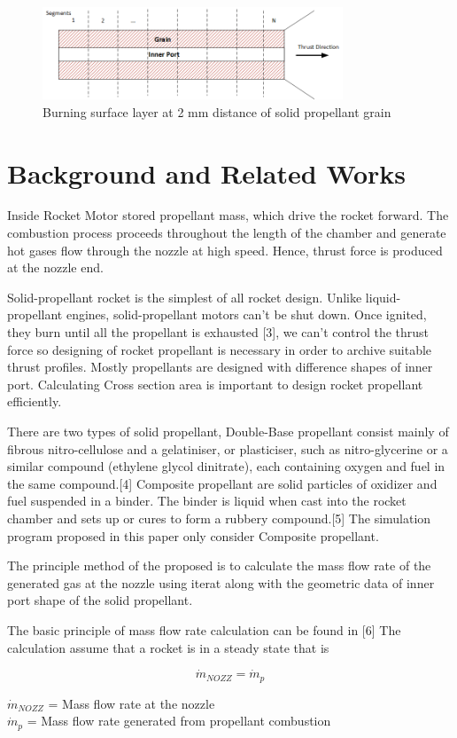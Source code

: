 \documentclass[conference]{IEEEtran}
\begin{document}
\begin{figure}[t]
\centering
\includegraphics[width=0.8\textwidth]{propellant_cut}
\caption{Burning surface layer at 2 mm distance of solid propellant grain}
\label{fig:2_1}
\end{figure}

\section{Background and Related Works}
Inside Rocket Motor stored propellant mass, which drive the rocket forward. The combustion process proceeds throughout the length of the chamber and generate hot gases flow through the nozzle at high speed. Hence, thrust force is produced at the nozzle end.

 Solid-propellant rocket is the simplest of all rocket design. Unlike liquid-propellant engines, solid-propellant motors can’t be shut down. Once ignited, they burn until all the propellant is exhausted [3],  we can’t control the thrust force so designing of rocket propellant is necessary in order to archive suitable thrust profiles. Mostly propellants are designed with difference shapes of inner port. Calculating Cross section area is important to design rocket propellant efficiently.
 
There are two types of solid propellant, Double-Base propellant consist mainly of fibrous nitro-cellulose and a gelatiniser, or plasticiser, such as nitro-glycerine or a similar compound (ethylene glycol dinitrate), each containing oxygen and fuel in the same compound.[4] Composite propellant are solid particles of oxidizer and fuel suspended in a binder. The binder is liquid when cast into the rocket chamber and sets up or cures to form a rubbery compound.[5] The simulation program proposed in this paper only consider Composite propellant.

The principle method of the proposed  is to calculate the mass flow rate of the generated gas at the nozzle using iterat along with the geometric data of inner port shape of the solid propellant.

The basic principle of mass flow rate calculation can be found in [6] The calculation assume that a rocket is in a steady state that is
\begin{center}
\begin{equation}
\dot{m}_{NOZZ} = \dot{m}_{p}
\end{equation}
\end{center}
$\dot{m}_{NOZZ}$ = Mass flow rate at the nozzle\\
$\dot{m}_{p}$ = Mass flow rate generated from propellant combustion\\		
\end{document}
